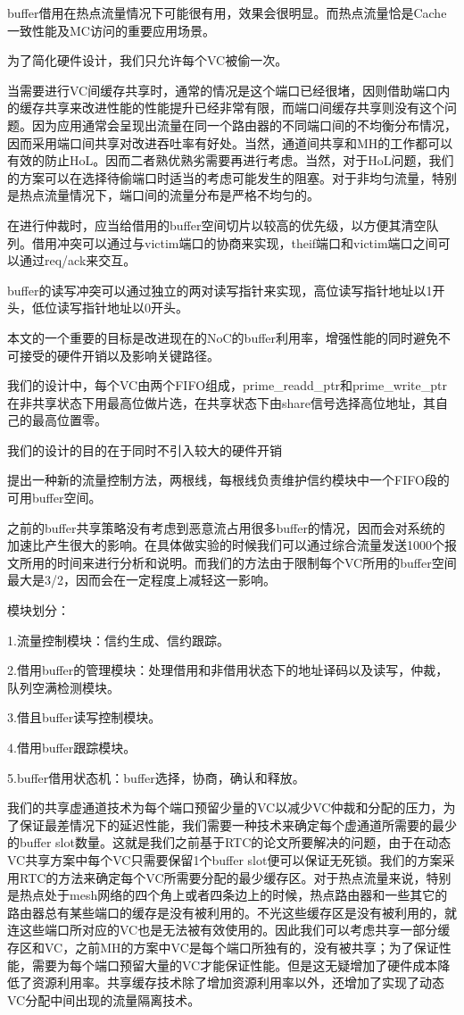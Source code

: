 \documentclass[10pt,journal]{IEEEtran}
\begin{document}
buffer借用在热点流量情况下可能很有用，效果会很明显。而热点流量恰是Cache一致性能及MC访问的重要应用场景。

为了简化硬件设计，我们只允许每个VC被偷一次。

当需要进行VC间缓存共享时，通常的情况是这个端口已经很堵，因则借助端口内的缓存共享来改进性能的性能提升已经非常有限，而端口间缓存共享则没有这个问题。因为应用通常会呈现出流量在同一个路由器的不同端口间的不均衡分布情况，因而采用端口间共享对改进吞吐率有好处。当然，通道间共享和MH的工作都可以有效的防止HoL。因而二者熟优熟劣需要再进行考虑。当然，对于HoL问题，我们的方案可以在选择待偷端口时适当的考虑可能发生的阻塞。对于非均匀流量，特别是热点流量情况下，端口间的流量分布是严格不均匀的。

在进行仲裁时，应当给借用的buffer空间切片以较高的优先级，以方便其清空队列。借用冲突可以通过与victim端口的协商来实现，theif端口和victim端口之间可以通过req/ack来交互。

buffer的读写冲突可以通过独立的两对读写指针来实现，高位读写指针地址以1开头，低位读写指针地址以0开头。

本文的一个重要的目标是改进现在的NoC的buffer利用率，增强性能的同时避免不可接受的硬件开销以及影响关键路径。

我们的设计中，每个VC由两个FIFO组成，prime\_readd\_ptr和prime\_write\_ptr在非共享状态下用最高位做片选，在共享状态下由share信号选择高位地址，其自己的最高位置零。

我们的设计的目的在于同时不引入较大的硬件开销

提出一种新的流量控制方法，两根线，每根线负责维护信约模块中一个FIFO段的可用buffer空间。

之前的buffer共享策略没有考虑到恶意流占用很多buffer的情况，因而会对系统的加速比产生很大的影响。在具体做实验的时候我们可以通过综合流量发送1000个报文所用的时间来进行分析和说明。而我们的方法由于限制每个VC所用的buffer空间最大是3/2，因而会在一定程度上减轻这一影响。

模块划分：

1.流量控制模块：信约生成、信约跟踪。

2.借用buffer的管理模块：处理借用和非借用状态下的地址译码以及读写，仲裁，队列空满检测模块。

3.借且buffer读写控制模块。

4.借用buffer跟踪模块。

5.buffer借用状态机：buffer选择，协商，确认和释放。

我们的共享虚通道技术为每个端口预留少量的VC以减少VC仲裁和分配的压力，为了保证最差情况下的延迟性能，我们需要一种技术来确定每个虚通道所需要的最少的buffer slot数量。这就是我们之前基于RTC的论文所要解决的问题，由于在动态VC共享方案中每个VC只需要保留1个buffer slot便可以保证无死锁。我们的方案采用RTC的方法来确定每个VC所需要分配的最少缓存区。对于热点流量来说，特别是热点处于mesh网络的四个角上或者四条边上的时候，热点路由器和一些其它的路由器总有某些端口的缓存是没有被利用的。不光这些缓存区是没有被利用的，就连这些端口所对应的VC也是无法被有效使用的。因此我们可以考虑共享一部分缓存区和VC，之前MH的方案中VC是每个端口所独有的，没有被共享；为了保证性能，需要为每个端口预留大量的VC才能保证性能。但是这无疑增加了硬件成本降低了资源利用率。共享缓存技术除了增加资源利用率以外，还增加了实现了动态VC分配中间出现的流量隔离技术。
\end{document}
